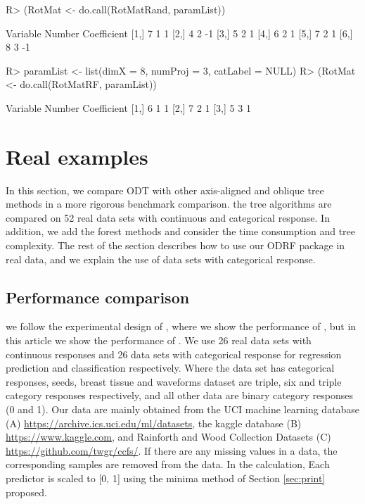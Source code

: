 \documentclass[nojss]{jss}
\numberwithin{equation}{section}
\begin{document}
\begin{Schunk}
\begin{Sinput}
R> (RotMat <- do.call(RotMatRand, paramList))
\end{Sinput}
\begin{Soutput}
     Variable Number Coefficient
[1,]        7      1           1
[2,]        4      2          -1
[3,]        5      2           1
[4,]        6      2           1
[5,]        7      2           1
[6,]        8      3          -1
\end{Soutput}
\begin{Sinput}
R> paramList <- list(dimX = 8, numProj = 3, catLabel = NULL)
R> (RotMat <- do.call(RotMatRF, paramList))
\end{Sinput}
\begin{Soutput}
     Variable Number Coefficient
[1,]        6      1           1
[2,]        7      2           1
[3,]        5      3           1
\end{Soutput}
\end{Schunk}
\section{Real examples} \label{sec:examples}
In this section, we compare ODT with other axis-aligned and oblique tree methods in a more rigorous benchmark comparison. the tree algorithms are compared on 52 real data sets with continuous and categorical response. In addition, we add the forest methods and consider the time consumption and tree complexity. The rest of the section describes how to use our ODRF package in real data, and we explain the use of data sets with categorical response.

\subsection{Performance comparison}
we follow the experimental design of \cite{zhan2022consistency}, where we show the performance of  , but in this article we show the performance of . We use 26 real data sets with continuous responses  and 26 data sets with categorical response for regression prediction and classification respectively. Where the data set has categorical responses, seeds, breast tissue and waveforms dataset are triple, six and triple category responses respectively, and all other data are binary category responses (0 and 1). Our data are mainly obtained from the UCI machine learning database (A) \url{https://archive.ics.uci.edu/ml/datasets}, the kaggle database (B) \url{https://www.kaggle.com}, and Rainforth and Wood \cite{rainforth2015canonical} Collection Datasets (C) \url{https://github.com/twgr/ccfs/}.
If there are any missing values in a data, the corresponding samples are removed from the data. In the calculation, Each predictor is scaled to [0, 1] using the minima method of Section \ref{sec:print} proposed.
\end{document}
